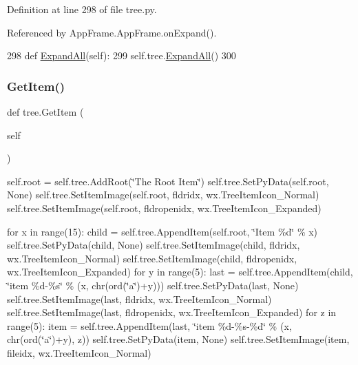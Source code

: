 Definition at line 298 of file tree.\+py.



Referenced by App\+Frame.\+App\+Frame.\+on\+Expand().


\begin{DoxyCode}
298     \textcolor{keyword}{def }\hyperlink{namespacetree_a68fefd05a9fba45bef73547aabebed51}{ExpandAll}(self):
299         self.tree.\hyperlink{namespacetree_a68fefd05a9fba45bef73547aabebed51}{ExpandAll}()
300 
\end{DoxyCode}
\mbox{\label{namespacetree_a2d9ace69c820aa1a47a130d6f2563dd5}} 
\subsubsection{\texorpdfstring{Get\+Item()}{GetItem()}}
{\footnotesize\ttfamily def tree.\+Get\+Item (\begin{DoxyParamCaption}\item[{}]{self }\end{DoxyParamCaption})}



self.\+root = self.\+tree.\+Add\+Root(\char`\"{}\+The Root Item\char`\"{}) self.\+tree.\+Set\+Py\+Data(self.\+root, None) self.\+tree.\+Set\+Item\+Image(self.\+root, fldridx, wx.\+Tree\+Item\+Icon\+\_\+\+Normal) self.\+tree.\+Set\+Item\+Image(self.\+root, fldropenidx, wx.\+Tree\+Item\+Icon\+\_\+\+Expanded) 

for x in range(15)\+: child = self.\+tree.\+Append\+Item(self.\+root, \char`\"{}\+Item \%d\char`\"{} \% x) self.\+tree.\+Set\+Py\+Data(child, None) self.\+tree.\+Set\+Item\+Image(child, fldridx, wx.\+Tree\+Item\+Icon\+\_\+\+Normal) self.\+tree.\+Set\+Item\+Image(child, fldropenidx, wx.\+Tree\+Item\+Icon\+\_\+\+Expanded) for y in range(5)\+: last = self.\+tree.\+Append\+Item(child, \char`\"{}item \%d-\/\%s\char`\"{} \% (x, chr(ord(\char`\"{}a\char`\"{})+y))) self.\+tree.\+Set\+Py\+Data(last, None) self.\+tree.\+Set\+Item\+Image(last, fldridx, wx.\+Tree\+Item\+Icon\+\_\+\+Normal) self.\+tree.\+Set\+Item\+Image(last, fldropenidx, wx.\+Tree\+Item\+Icon\+\_\+\+Expanded) for z in range(5)\+: item = self.\+tree.\+Append\+Item(last, \char`\"{}item \%d-\/\%s-\/\%d\char`\"{} \% (x, chr(ord(\char`\"{}a\char`\"{})+y), z)) self.\+tree.\+Set\+Py\+Data(item, None) self.\+tree.\+Set\+Item\+Image(item, fileidx, wx.\+Tree\+Item\+Icon\+\_\+\+Normal) 


